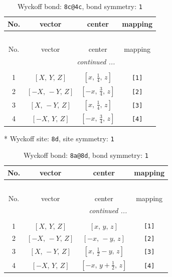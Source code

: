 \documentclass[fleqn,8pt]{jsarticle}
\begin{document}
\begin{longtable}{cccc}
\caption{Wyckoff bond: {\tt 8c@4c}, bond symmetry: {\tt 1}}
 \\
 \hline \hline
No. & vector & center & mapping \\ \hline \endfirsthead

\multicolumn{3}{l}{\tablename\ \thetable{}} \\
 \hline \hline
No. & vector & center & mapping \\ \hline \endhead

 \hline \hline
\multicolumn{3}{r}{\footnotesize\it continued ...} \\ \endfoot

 \hline \hline
\multicolumn{3}{r}{} \\ \endlastfoot

1 & $\left[ X,\, Y,\, Z \right]$ & $\left[ x,\, \frac{1}{4},\, z \right]$ & {\tt [1]} \\ \hline
2 & $\left[ - X,\, - Y,\, Z \right]$ & $\left[ - x,\, \frac{3}{4},\, z \right]$ & {\tt [2]} \\ \hline
3 & $\left[ X,\, - Y,\, Z \right]$ & $\left[ x,\, \frac{1}{4},\, z \right]$ & {\tt [3]} \\ \hline
4 & $\left[ - X,\, Y,\, Z \right]$ & $\left[ - x,\, \frac{3}{4},\, z \right]$ & {\tt [4]} \\
\end{longtable}
* Wyckoff site: {\tt 8d}, site symmetry: {\tt 1}
\renewcommand{\arraystretch}{1.2}
\begin{longtable}{cccc}
\caption{Wyckoff bond: {\tt 8a@8d}, bond symmetry: {\tt 1}}
 \\
 \hline \hline
No. & vector & center & mapping \\ \hline \endfirsthead

\multicolumn{3}{l}{\tablename\ \thetable{}} \\
 \hline \hline
No. & vector & center & mapping \\ \hline \endhead

 \hline \hline
\multicolumn{3}{r}{\footnotesize\it continued ...} \\ \endfoot

 \hline \hline
\multicolumn{3}{r}{} \\ \endlastfoot

1 & $\left[ X,\, Y,\, Z \right]$ & $\left[ x,\, y,\, z \right]$ & {\tt [1]} \\ \hline
2 & $\left[ - X,\, - Y,\, Z \right]$ & $\left[ - x,\, - y,\, z \right]$ & {\tt [2]} \\ \hline
3 & $\left[ X,\, - Y,\, Z \right]$ & $\left[ x,\, \frac{1}{2} - y,\, z \right]$ & {\tt [3]} \\ \hline
4 & $\left[ - X,\, Y,\, Z \right]$ & $\left[ - x,\, y + \frac{1}{2},\, z \right]$ & {\tt [4]} \\
\end{longtable}
\end{document}
